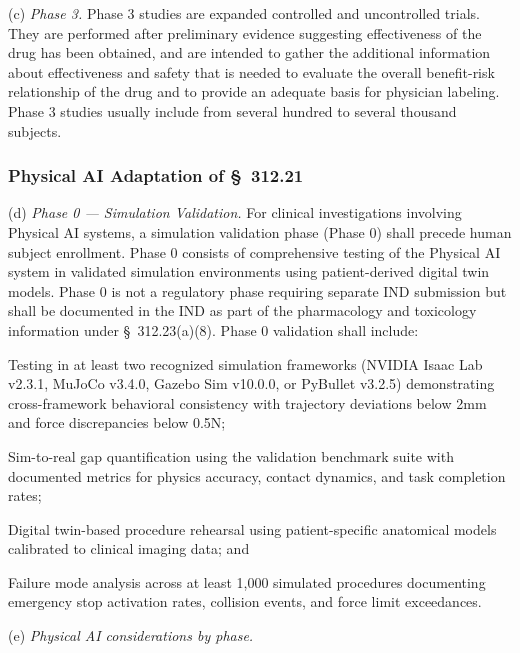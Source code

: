(c) \textit{Phase 3.} Phase 3 studies are expanded controlled and uncontrolled trials. They are performed after preliminary evidence suggesting effectiveness of the drug has been obtained, and are intended to gather the additional information about effectiveness and safety that is needed to evaluate the overall benefit-risk relationship of the drug and to provide an adequate basis for physician labeling. Phase 3 studies usually include from several hundred to several thousand subjects.

\subsubsection{Physical AI Adaptation of \S~312.21}

(d) \textit{Phase 0 --- Simulation Validation.} For clinical investigations involving Physical AI systems, a simulation validation phase (Phase 0) shall precede human subject enrollment. Phase 0 consists of comprehensive testing of the Physical AI system in validated simulation environments using patient-derived digital twin models. Phase 0 is not a regulatory phase requiring separate IND submission but shall be documented in the IND as part of the pharmacology and toxicology information under \S~312.23(a)(8). Phase 0 validation shall include:

\begin{description}[leftmargin=0.8cm,style=sameline]
\item[(i)] Testing in at least two recognized simulation frameworks (NVIDIA Isaac Lab v2.3.1, MuJoCo v3.4.0, Gazebo Sim v10.0.0, or PyBullet v3.2.5) demonstrating cross-framework behavioral consistency with trajectory deviations below 2mm and force discrepancies below 0.5N;
\item[(ii)] Sim-to-real gap quantification using the validation benchmark suite with documented metrics for physics accuracy, contact dynamics, and task completion rates;
\item[(iii)] Digital twin-based procedure rehearsal using patient-specific anatomical models calibrated to clinical imaging data; and
\item[(iv)] Failure mode analysis across at least 1,000 simulated procedures documenting emergency stop activation rates, collision events, and force limit exceedances.
\end{description}

(e) \textit{Physical AI considerations by phase.}

